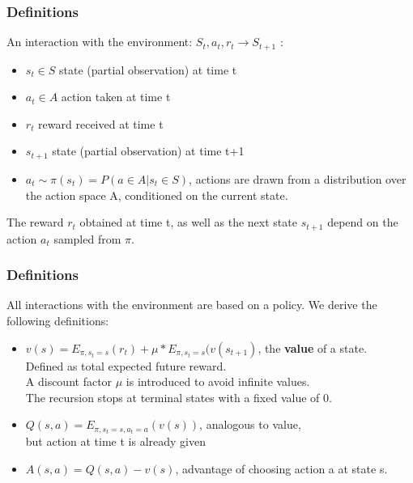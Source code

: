 \documentclass{beamer}
\begin{document}
\begin{frame}
\frametitle{Definitions}
An interaction with the environment: \(S_t, a_t, r_t \rightarrow S_{t+1}\) :
\begin{itemize}
\item \(s_t \in S\) state (partial observation) at time t
\item \(a_t \in A\) action taken at time t
\item \(r_t\) reward received at time t
\item \(s_{t+1}\) state (partial observation) at time t+1
\item \(a_t \sim \pi(s_t) = P(a \in A | s_t \in S)\), actions are drawn from a distribution over the action space A, conditioned on the current state.
\end{itemize}
\bigskip
The reward \(r_t\) obtained at time t, as well as the next state \(s_{t+1}\) depend on the action \(a_t\) sampled from \(\pi\).
\end{frame}

\begin{frame}
\frametitle{Definitions}
All interactions with the environment are based on a policy. We derive the following definitions:
\begin{itemize}
\item \(v(s) = E_{\pi, s_t = s}(r_t) + \mu * E_{\pi, s_t = s}(v(s_{t+1})\), the \textbf{value} of a state.\\
Defined as total expected future reward.\\
A discount factor \(\mu\) is introduced to avoid infinite values.\\
The recursion stops at terminal states with a fixed value of 0.
\item \(Q(s, a) = E_{\pi, s_t = s, a_t= a} (v(s))\), analogous to value, \\
but action at time t is already given
\item \(A(s, a) = Q(s, a) - v(s)\), advantage of choosing action a at state s.
\end{itemize}
\end{frame}
\end{document}
